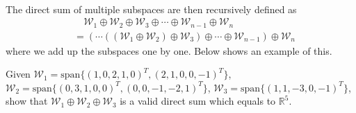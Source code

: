 \\
The direct sum of multiple subspaces are then recursively defined as
\begin{align*}
&\quad \mathcal{W}_1 \oplus \mathcal{W}_2 \oplus \mathcal{W}_3 \oplus \cdots \oplus \mathcal{W}_{n-1} \oplus \mathcal{W}_n \\
&= (\cdots((\mathcal{W}_1 \oplus \mathcal{W}_2) \oplus \mathcal{W}_3) \oplus \cdots \oplus \mathcal{W}_{n-1}) \oplus \mathcal{W}_n
\end{align*}
where we add up the subspaces one by one. Below shows an example of this.
\begin{exmp}
\label{exmp:directsum}
Given $\mathcal{W}_1 = \text{span}\{(1,0,2,1,0)^T, (2,1,0,0,-1)^T\}$, $\mathcal{W}_2 = \text{span}\{(0,3,1,0,0)^T, (0,0,-1,-2,1)^T\}$, $\mathcal{W}_3 = \text{span}\{(1,1,-3,0,-1)^T\}$, show that $\mathcal{W}_1 \oplus \mathcal{W}_2 \oplus \mathcal{W}_3$ is a valid direct sum which equals to $\mathbb{R}^5$.
\end{exmp}
